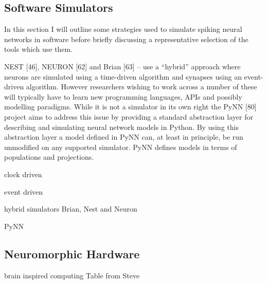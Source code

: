 \subsection{Software Simulators}
In this section I will outline some strategies used to simulate spiking neural networks
in software before briefly discussing a representative selection of the tools
which use them.

NEST [46], NEURON [62] and Brian [63] – use
a “hybrid” approach where neurons are simulated using a time-driven algorithm
and synapses using an event-driven algorithm.
However researchers wishing to work across
a number of these will typically have to learn new programming languages, APIs
and possibly modelling paradigms.
While it is not a simulator in its own right the PyNN [80] project aims to address
this issue by providing a standard abstraction layer for describing and simulating
neural network models in Python. By using this abstraction layer a model
defined in PyNN can, at least in principle, be run unmodified on any supported
simulator. PyNN defines models in terms of populations and projections.

clock driven

event driven

hybrid simulators Brian, Nest and Neuron

PyNN
\subsection{Neuromorphic Hardware}
brain inspired computing
Table from Steve
